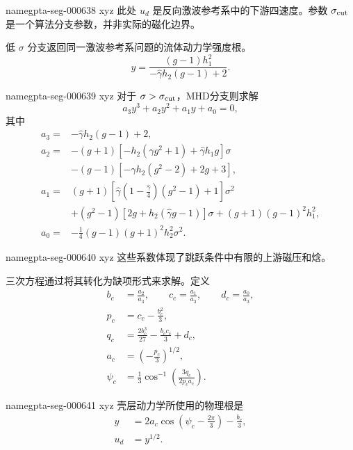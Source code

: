 \documentclass[twocolumn]{aastex702}
\makeatletter
\providecommand{\gptareaderanchor}[1]{\pdfdest name{#1} xyz}%
\providecommand{\gptareaderanchor}[1]{\special{pdf:dest (#1) [ @thispage /XYZ @xpos @ypos null ]}}%
\makeatother
\begin{document}
\gptareaderanchor{gpta-seg-000638}%
此处 \(u_d\) 是反向激波参考系中的下游四速度。参数 \(\sigma_{\rm cut}\) 是一个算法分支参数，并非实际的磁化边界。

低 \(\sigma\) 分支返回同一激波参考系问题的流体动力学强度根。
\begin{equation}
y=\frac{(g-1)h_1^2}{-\hat{\gamma}h_2(g-1)+2}.
\end{equation}

\gptareaderanchor{gpta-seg-000639}%
对于 \(\sigma>\sigma_{\rm cut}\)，MHD分支则求解
\begin{equation}
a_3y^3+a_2y^2+a_1y+a_0=0,
\end{equation}
其中
\begin{equation}
\begin{aligned}
a_3={}&-\hat{\gamma}h_2(g-1)+2,\\
a_2={}&-(g+1)\left[-h_2(\hat{\gamma}g^2+1)+\hat{\gamma}h_1g\right]\sigma\\
&-(g-1)\left[-\hat{\gamma}h_2(g^2-2)+2g+3\right],\\
a_1={}&(g+1)\left[\hat{\gamma}\left(1-\frac{\hat{\gamma}}{4}\right)
(g^2-1)+1\right]\sigma^2\\
&+(g^2-1)\left[2g+h_2(\hat{\gamma}g-1)\right]\sigma
+(g+1)(g-1)^2h_1^2,\\
a_0={}&-\frac{1}{4}(g-1)(g+1)^2h_2^2\sigma^2 .
\end{aligned}
\end{equation}

\gptareaderanchor{gpta-seg-000640}%
这些系数体现了跳跃条件中有限的上游磁压和焓。

三次方程通过将其转化为缺项形式来求解。定义
\begin{equation}
\begin{aligned}
b_c&=\frac{a_2}{a_3},\qquad
c_c=\frac{a_1}{a_3},\qquad
d_c=\frac{a_0}{a_3},\\
p_c&=c_c-\frac{b_c^2}{3},\\
q_c&=\frac{2b_c^3}{27}-\frac{b_cc_c}{3}+d_c,\\
a_c&=\left(-\frac{p_c}{3}\right)^{1/2},\\
\psi_c&=\frac{1}{3}\cos^{-1}\!\left(\frac{3q_c}{2p_ca_c}\right).
\end{aligned}
\end{equation}

\gptareaderanchor{gpta-seg-000641}%
壳层动力学所使用的物理根是
\begin{equation}
\begin{aligned}
y&=2a_c\cos\left(\psi_c-\frac{2\pi}{3}\right)-\frac{b_c}{3},\\
u_d&=y^{1/2}.
\end{aligned}
\end{equation}
\end{document}
